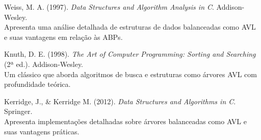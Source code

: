 \documentclass[a4paper, 12pt, english]{article}
\begin{document}
\begin{thebibliography}{9}
Weiss, M. A. (1997). 
\textit{Data Structures and Algorithm Analysis in C}. Addison-Wesley.
\\
Apresenta uma análise detalhada de estruturas de dados balanceadas como AVL e suas vantagens em relação às ABPs.

Knuth, D. E. (1998). 
\textit{The Art of Computer Programming: Sorting and Searching} (2ª ed.). Addison-Wesley.
\\
Um clássico que aborda algoritmos de busca e estruturas como árvores AVL com profundidade teórica.


Kerridge, J., \& Kerridge M. (2012). 
\textit{Data Structures and Algorithms in C}. Springer.
\\
Apresenta implementações detalhadas sobre árvores balanceadas como AVL e suas vantagens práticas.


\end{thebibliography}

 



\noindent
\end{document}
